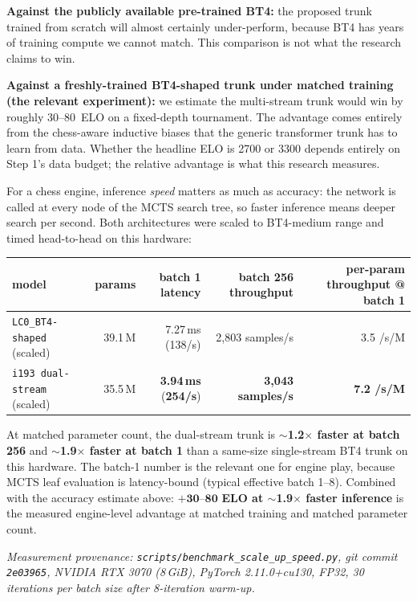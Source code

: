 \documentclass[10pt,a4paper]{article}
\begin{document}
\begin{tcolorbox}[goodcallout, title=Realistic outcome --- accuracy]
\textbf{Against the publicly available pre-trained BT4:} the proposed trunk
trained from scratch will almost certainly under-perform, because BT4 has
years of training compute we cannot match. This comparison is not what the
research claims to win.

\textbf{Against a freshly-trained BT4-shaped trunk under matched training
(the relevant experiment):} we estimate the multi-stream trunk would win by
roughly $30$--$80$~ELO on a fixed-depth tournament. The advantage comes
entirely from the chess-aware inductive biases that the generic transformer
trunk has to learn from data. Whether the headline ELO is 2700 or 3300
depends entirely on Step 1's data budget; the relative advantage is what
this research measures.
\end{tcolorbox}

\begin{tcolorbox}[goodcallout, title=Realistic outcome --- speed (measured)]
For a chess engine, inference \emph{speed} matters as much as accuracy: the
network is called at every node of the MCTS search tree, so faster inference
means deeper search per second. Both architectures were scaled to BT4-medium
range and timed head-to-head on this hardware:

\begin{footnotesize}
\begin{tabularx}{\linewidth}{@{}L r r r r@{}}
\toprule
\textbf{model} & \textbf{params} & \textbf{batch 1 latency} & \textbf{batch 256 throughput} & \textbf{per-param throughput @ batch 1} \\
\midrule
\texttt{LC0\_BT4-shaped} (scaled) & 39.1\,M & 7.27\,ms (138/s) & 2{,}803 samples/s & 3.5 /s/M \\
\texttt{i193 dual-stream} (scaled) & 35.5\,M & \textbf{3.94\,ms} (\textbf{254/s}) & \textbf{3{,}043 samples/s} & \textbf{7.2 /s/M} \\
\bottomrule
\end{tabularx}
\end{footnotesize}

\medskip
At matched parameter count, the dual-stream trunk is
\textbf{$\sim$1.2$\times$ faster at batch 256} and \textbf{$\sim$1.9$\times$
faster at batch 1} than a same-size single-stream BT4 trunk on this hardware.
The batch-1 number is the relevant one for engine play, because MCTS leaf
evaluation is latency-bound (typical effective batch 1--8). Combined with the
accuracy estimate above: $\mathbf{+30}$--$\mathbf{80}$ \textbf{ELO at
$\sim$1.9$\times$ faster inference} is the measured engine-level advantage at
matched training and matched parameter count.

\vspace{2pt}
{\scriptsize\textit{Measurement provenance: \texttt{scripts/benchmark\_scale\_up\_speed.py},
git commit \texttt{2e03965}, NVIDIA RTX 3070 (8\,GiB), PyTorch 2.11.0+cu130,
FP32, 30 iterations per batch size after 8-iteration warm-up.}}
\end{tcolorbox}
\end{document}
